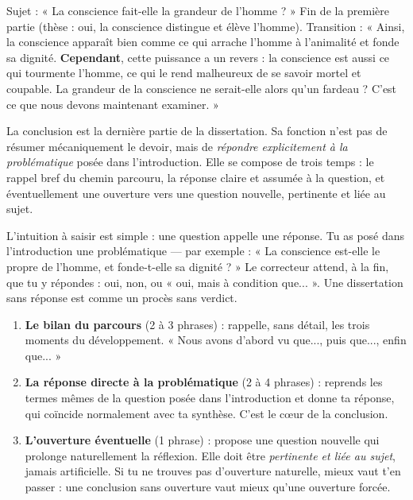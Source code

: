 \documentclass[11pt]{article}
\newcommand{\cle}[1]{{\popxbold\color{popdark}#1}}
\newcounter{popsec}
\newcounter{popsub}
\newcommand{\courssub}[1]{%
  \stepcounter{popsub}%
  \par\vspace{9pt}\noindent{\popxbold\fontsize{11.5}{13}\selectfont\color{popink}{\color{poporange}\thepopsec.\thepopsub}\hspace{6pt}#1}\par\nopagebreak\vspace{4pt}
}
\begin{document}
\begin{exemplebox}
Sujet : « La conscience fait-elle la grandeur de l'homme ? » Fin de la première partie (thèse : oui, la conscience distingue et élève l'homme). Transition : « Ainsi, la conscience apparaît bien comme ce qui arrache l'homme à l'animalité et fonde sa dignité. \textbf{Cependant}, cette puissance a un revers : la conscience est aussi ce qui tourmente l'homme, ce qui le rend malheureux de se savoir mortel et coupable. La grandeur de la conscience ne serait-elle alors qu'un fardeau ? C'est ce que nous devons maintenant examiner. »
\end{exemplebox}

\courssub{La conclusion : répondre à la question posée}

\begin{definition}[La conclusion]
La \cle{conclusion} est la dernière partie de la dissertation. Sa fonction n'est pas de résumer mécaniquement le devoir, mais de \emph{répondre explicitement à la problématique} posée dans l'introduction. Elle se compose de trois temps : le rappel bref du chemin parcouru, la réponse claire et assumée à la question, et éventuellement une ouverture vers une question nouvelle, pertinente et liée au sujet.
\end{definition}

L'intuition à saisir est simple : une question appelle une réponse. Tu as posé dans l'introduction une problématique — par exemple : « La conscience est-elle le propre de l'homme, et fonde-t-elle sa dignité ? » Le correcteur attend, à la fin, que tu y répondes : oui, non, ou « oui, mais à condition que... ». Une dissertation sans réponse est comme un procès sans verdict.

\begin{methode}
\begin{enumerate}
\item \textbf{Le bilan du parcours} (2 à 3 phrases) : rappelle, sans détail, les trois moments du développement. « Nous avons d'abord vu que..., puis que..., enfin que... »
\item \textbf{La réponse directe à la problématique} (2 à 4 phrases) : reprends les termes mêmes de la question posée dans l'introduction et donne ta réponse, qui coïncide normalement avec ta synthèse. C'est le cœur de la conclusion.
\item \textbf{L'ouverture éventuelle} (1 phrase) : propose une question nouvelle qui prolonge naturellement la réflexion. Elle doit être \emph{pertinente et liée au sujet}, jamais artificielle. Si tu ne trouves pas d'ouverture naturelle, mieux vaut t'en passer : une conclusion sans ouverture vaut mieux qu'une ouverture forcée.
\end{enumerate}
\end{methode}
\end{document}
